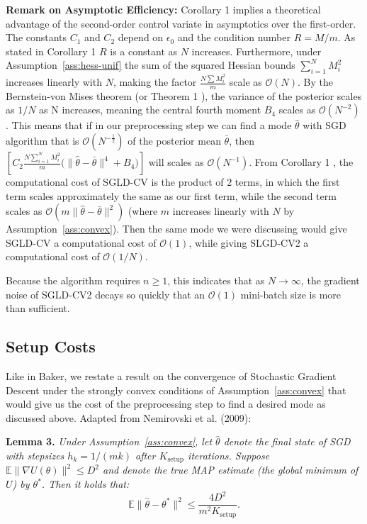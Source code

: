 \textbf{Remark on Asymptotic Efficiency:} Corollary 1 implies a theoretical advantage of the second-order control variate in asymptotics over the first-order. The constants $C_1$ and $C_2$ depend on $\epsilon_0$ and the condition number $R = M/m$. As stated in Corollary 1 \cite{baker2017} $R$ is a constant as $N$ increases. Furthermore, under Assumption~\ref{ass:hess-unif} the sum of the squared Hessian bounds $\sum_{i=1}^N M_i^2$ increases linearly with $N$, making the factor $\frac{N \sum M_i^2}{m}$ scale as $\mathcal{O}(N)$. By the Bernstein-von Mises theorem (or Theorem 1 \cite{durmus2016highdimensional}), the variance of the posterior scales as $1/N$ as N increases, meaning the central fourth moment $B_4$ scales as $\mathcal{O}(N^{-2})$. This means that if in our preprocessing step we can find a mode $\hat\theta$ with SGD algorithm that is $\mathcal{O}(N^{-\frac{1}{2}})$ of the posterior mean $\bar\theta$, then $\left[ C_2 \frac{N \sum_{i=1}^N M_i^2}{m} \Big( \|\hat\theta - \bar\theta\|^4 + B_4 \Big) \right]$ will scales as $\mathcal{O}(N^{-1})$. From Corollary 1 \cite{baker2017}, the computational cost of SGLD-CV is the product of $2$ terms, in which the first term scales approximately the same as our first term, while the second term scales as $\mathcal{O}(m\|\hat\theta - \bar\theta\|^2)$ (where $m$ increases linearly with $N$ by Assumption~\ref{ass:convex}). Then the same mode we were discussing would give SGLD-CV a computational cost of $\mathcal{O}(1)$, while giving SLGD-CV2 a computational cost of $\mathcal{O}(1/N)$.

Because the algorithm requires $n \geq 1$, this indicates that as $N \to \infty$, the gradient noise of SGLD-CV2 decays so quickly that an $\mathcal{O}(1)$ mini-batch size is more than sufficient.

\subsection*{Setup Costs}
Like in Baker, we restate a result on the convergence of Stochastic Gradient Descent under the strongly convex conditions of Assumption~\ref{ass:convex} that would give us the cost of the preprocessing step to find a desired mode as discussed above. Adapted from Nemirovski et al. (2009):

\textbf{Lemma 3.} \textit{Under Assumption~\ref{ass:convex}, let $\hat\theta$ denote the final state of SGD with stepsizes $h_k = 1/(mk)$ after $K_{\text{setup}}$ iterations. Suppose $\mathbb{E}\|\nabla U(\theta)\|^2 \leq D^2$ and denote the true MAP estimate (the global minimum of $U$) by $\theta^*$. Then it holds that:}
\begin{equation}
    \mathbb{E}\|\hat\theta - \theta^*\|^2 \leq \frac{4D^2}{m^2 K_{\text{setup}}}.
\end{equation}

